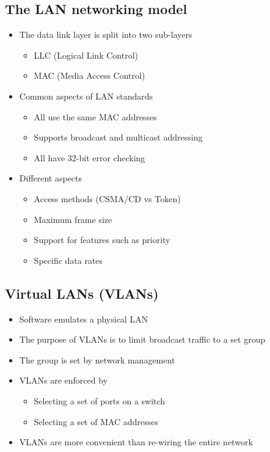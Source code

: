 \subsection*{The LAN networking model}

\begin{itemize}
  \item The data link layer is split into two sub-layers
  \begin{itemize}
    \item LLC (Logical Link Control)
    \item MAC (Media Access Control)
  \end{itemize}
  \item Common aspects of LAN standards
  \begin{itemize}
    \item All use the same MAC addresses
    \item Supports broadcast and multicast addressing
    \item All have 32-bit error checking
  \end{itemize}
  \item Different aspects
  \begin{itemize}
    \item Access methods (CSMA/CD vs Token)
    \item Maximum frame size
    \item Support for features such as priority
    \item Specific data rates
  \end{itemize}
\end{itemize}

\subsection*{Virtual LANs (VLANs)}

\begin{itemize}
  \item Software emulates a physical LAN
  \item The purpose of VLANs is to limit broadcast traffic to a set group
  \item The group is set by network management
  \item VLANs are enforced by
  \begin{itemize}
    \item Selecting a set of ports on a switch
    \item Selecting a set of MAC addresses
  \end{itemize}
  \item VLANs are more convenient than re-wiring the entire network
\end{itemize}

